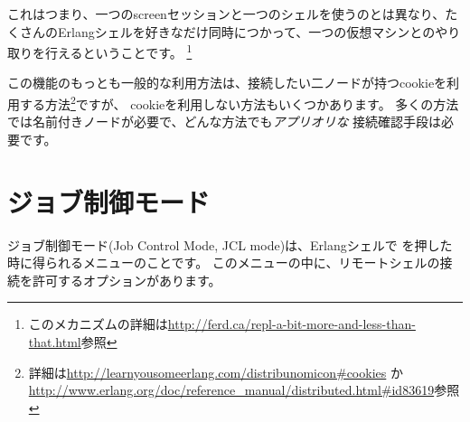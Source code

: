 これはつまり、一つのscreenセッションと一つのシェルを使うのとは異なり、たくさんのErlangシェルを好きなだけ同時につかって、一つの仮想マシンとのやり取りを行えるということです。
\footnote{このメカニズムの詳細は\href{http://ferd.ca/repl-a-bit-more-and-less-than-that.html}{http://ferd.ca/repl-a-bit-more-and-less-than-that.html}参照}

この機能のもっとも一般的な利用方法は、接続したい二ノードが持つcookieを利用する方法\footnote{詳細は\href{http://learnyousomeerlang.com/distribunomicon\#cookies}{http://learnyousomeerlang.com/distribunomicon\#cookies} か \href{http://www.erlang.org/doc/reference\_manual/distributed.html\#id83619}{http://www.erlang.org/doc/reference\_manual/distributed.html\#id83619}参照}ですが、
cookieを利用しない方法もいくつかあります。
多くの方法では名前付きノードが必要で、どんな方法でも\emph{アプリオリな} 接続確認手段は必要です。

\section{ジョブ制御モード}

ジョブ制御モード(Job Control Mode, JCL mode)は、Erlangシェルで  を押した時に得られるメニューのことです。
このメニューの中に、リモートシェルの接続を許可するオプションがあります。

